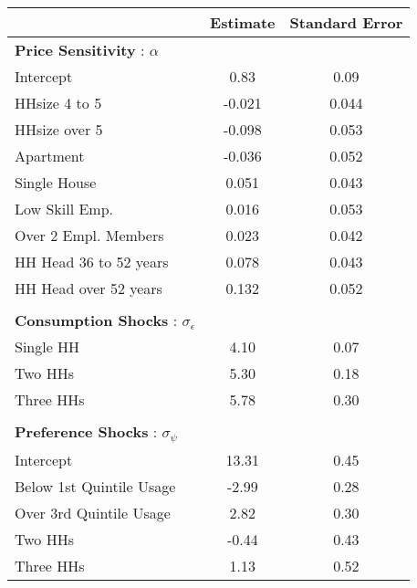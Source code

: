 \begin{tabular}{lcc}
& Estimate & Standard Error \\
\hline
\textbf{Price Sensitivity} : $\alpha$ & \multicolumn{2}{c}{}\\
Intercept &0.83&0.09\\
HHsize 4 to 5 &-0.021&0.044\\
HHsize over 5 &-0.098&0.053\\
Apartment &-0.036&0.052\\
Single House &0.051&0.043\\
Low Skill Emp. &0.016&0.053\\
Over 2 Empl. Members &0.023&0.042\\
HH Head 36 to 52 years  &0.078&0.043\\
HH Head over 52 years  &0.132&0.052\\
\multicolumn{3}{c}{} \\
\textbf{Consumption Shocks} : $\sigma_{\epsilon}$ & \multicolumn{2}{c}{}\\
Single HH &4.10&0.07\\
Two HHs &5.30&0.18\\
Three HHs &5.78&0.30\\
\multicolumn{3}{c}{} \\
\textbf{Preference Shocks} : $\sigma_{\psi}$ & \multicolumn{2}{c}{}\\
Intercept &13.31&0.45\\
Below 1st Quintile Usage &-2.99&0.28\\
Over 3rd Quintile Usage &2.82&0.30\\
Two HHs &-0.44&0.43\\
Three HHs &1.13&0.52\\
\hline
\end{tabular} 
